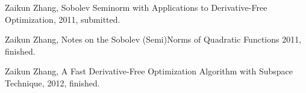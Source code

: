 
\begin{publications}{99}

\item Zaikun Zhang, Sobolev Seminorm with Applications to Derivative-Free
    Optimization, 2011, submitted.
\item Zaikun Zhang, Notes on the Sobolev (Semi)Norms of Quadratic Functions
    2011, finished.
\item Zaikun Zhang, A Fast Derivative-Free Optimization Algorithm with Subspace
    Technique, 2012, finished.

\end{publications}
